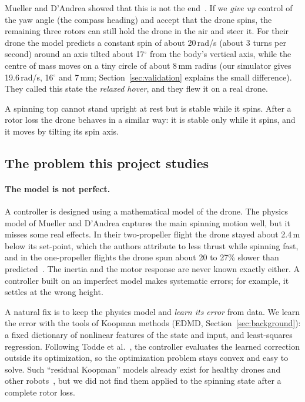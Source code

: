 Mueller and D'Andrea showed that this is not the end~\cite{mueller2014stability,mueller2016relaxed}. If we \emph{give up} control of the yaw angle (the compass heading) and accept that the drone spins, the remaining three rotors can still hold the drone in the air and steer it. For their drone the model predicts a constant spin of about 20\,rad/s (about 3 turns per second) around an axis tilted about 17$^\circ$ from the body's vertical axis, while the centre of mass moves on a tiny circle of about 8\,mm radius (our simulator gives 19.6\,rad/s, 16$^\circ$ and 7\,mm; Section~\ref{sec:validation} explains the small difference). They called this state the \emph{relaxed hover}, and they flew it on a real drone.

\begin{plain}
A spinning top cannot stand upright at rest but is stable while it spins. After a rotor loss the drone behaves in a similar way: it is stable only while it spins, and it moves by tilting its spin axis.
\end{plain}

\subsection{The problem this project studies}
\paragraph{The model is not perfect.} A controller is designed using a mathematical model of the drone. The physics model of Mueller and D'Andrea captures the main spinning motion well, but it misses some real effects. In their two-propeller flight the drone stayed about 2.4\,m below its set-point, which the authors attribute to less thrust while spinning fast, and in the one-propeller flights the drone spun about 20 to 27\% slower than predicted~\cite{mueller2014stability,mueller2016relaxed}. The inertia and the motor response are never known exactly either. A controller built on an imperfect model makes systematic errors; for example, it settles at the wrong height.

A natural fix is to keep the physics model and \emph{learn its error} from data. We learn the error with the tools of Koopman methods (EDMD, Section~\ref{sec:background}): a fixed dictionary of nonlinear features of the state and input, and least-squares regression. Following Todde et al.~\cite{todde2026residual}, the controller evaluates the learned correction outside its optimization, so the optimization problem stays convex and easy to solve. Such ``residual Koopman'' models already exist for healthy drones and other robots~\cite{todde2026residual,bruder2025residual,narayanan2026rkmpc}, but we did not find them applied to the spinning state after a complete rotor loss.


